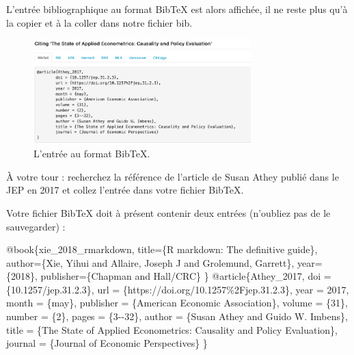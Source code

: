 \documentclass[
  11pt,
]{book}
\newenvironment{Shaded}{\begin{snugshade}}{\end{snugshade}}
\newcommand{\DataTypeTok}[1]{\textcolor[rgb]{0.13,0.29,0.53}{#1}}
\newcommand{\NormalTok}[1]{#1}
\newcommand{\OtherTok}[1]{\textcolor[rgb]{0.56,0.35,0.01}{#1}}
\newcommand{\VariableTok}[1]{\textcolor[rgb]{0.00,0.00,0.00}{#1}}
\numberwithin{equation}{section}
\numberwithin{countremarque}{section}
\newenvironment{greenbox}{
  \begin{tcolorbox}[breakable, colback=vert,coltext=black,
                  colframe=grisfonce]}
 {\end{tcolorbox}}
\begin{document}
L'entrée bibliographique au format BibTeX est alors affichée, il ne reste plus qu'à la copier et à la coller dans notre fichier bib.

\begin{figure}
\centering
\includegraphics[width=0.75\textwidth,height=\textheight]{figs/crossref_03.png}
\caption{L'entrée au format BibTeX.}
\end{figure}

\begin{greenbox}
À votre tour : recherchez la référence de l'article de Susan Athey publié dans le JEP en 2017 et collez l'entrée dans votre fichier BibTeX.

\end{greenbox}

Votre fichier BibTeX doit à présent contenir deux entrées (n'oubliez pas de le sauvegarder) :

\begin{Shaded}
\begin{Highlighting}[]
\VariableTok{@book}\NormalTok{\{}\OtherTok{xie\_2018\_rmarkdown}\NormalTok{,}
  \DataTypeTok{title}\NormalTok{=\{R markdown: The definitive guide\},}
  \DataTypeTok{author}\NormalTok{=\{Xie, Yihui and Allaire, Joseph J and Grolemund, Garrett\},}
  \DataTypeTok{year}\NormalTok{=\{2018\},}
  \DataTypeTok{publisher}\NormalTok{=\{Chapman and Hall/CRC\}}
\NormalTok{\}}
\VariableTok{@article}\NormalTok{\{}\OtherTok{Athey\_2017}\NormalTok{,}
    \DataTypeTok{doi}\NormalTok{ = \{10.1257/jep.31.2.3\},}
    \DataTypeTok{url}\NormalTok{ = \{https://doi.org/10.1257\%2Fjep.31.2.3\},}
    \DataTypeTok{year}\NormalTok{ = 2017,}
    \DataTypeTok{month}\NormalTok{ = \{may\},}
    \DataTypeTok{publisher}\NormalTok{ = \{American Economic Association\},}
    \DataTypeTok{volume}\NormalTok{ = \{31\},}
    \DataTypeTok{number}\NormalTok{ = \{2\},}
    \DataTypeTok{pages}\NormalTok{ = \{3{-}{-}32\},}
    \DataTypeTok{author}\NormalTok{ = \{Susan Athey and Guido W. Imbens\},}
    \DataTypeTok{title}\NormalTok{ = \{The State of Applied Econometrics:}
\NormalTok{    Causality and Policy Evaluation\},}
    \DataTypeTok{journal}\NormalTok{ = \{Journal of Economic Perspectives\}}
\NormalTok{\}}
\end{Highlighting}
\end{Shaded}
\end{document}
